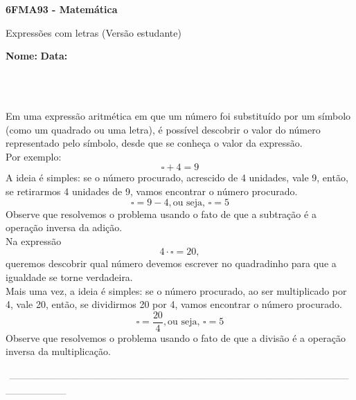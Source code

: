 \documentclass[a4paper,14pt]{article}
\begin{document}
	
	\noindent\textbf{6FMA93 - Matemática} 
	
	\begin{center}Expressões com letras (Versão estudante)
	\end{center}
	
	\noindent\textbf{Nome:} \underline{\hspace{10cm}}
	\noindent\textbf{Data:} \underline{\hspace{4cm}}
	
	~ \\ ~
	\begin{multicols}{2}
	\noindent Em uma expressão aritmética em que um número foi substituído por um símbolo (como um quadrado ou uma letra), é possível descobrir o valor do número representado pelo símbolo, desde que se conheça o valor da expressão. \\
	Por exemplo: \\
	\begin{equation*}
		\square + 4 = 9
	\end{equation*}
	A ideia é simples: se o número procurado, acrescido de 4 unidades, vale 9, então, se retirarmos 4 unidades de 9, vamos encontrar o número procurado.
	\begin{equation*}
		\square = 9 - 4, \text{ou seja,~} \square = 5
	\end{equation*}
	Observe que resolvemos o problema usando o fato de que a subtração é a operação inversa da adição. \\
	Na expressão \\
	\begin{equation*}
		4 \cdot \square = 20,
	\end{equation*}
	queremos descobrir qual número devemos escrever no quadradinho para que a igualdade se torne verdadeira. \\
	Mais uma vez, a ideia é simples: se o número procurado, ao ser multiplicado por 4, vale 20, então, se dividirmos 20 por 4, vamos encontrar o número procurado.
	\begin{equation*}
		\square = \frac{20}{4}, \text{ou seja,~} \square = 5
	\end{equation*}
	Observe que resolvemos o problema usando o fato de que a divisão é a operação inversa da multiplicação.
	\end{multicols}
\noindent\textsubscript{~-----------------------------------------------------------------------------------------------------------------------------------------------------}
\end{document}
